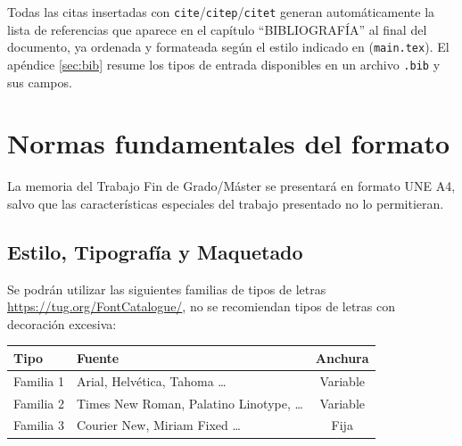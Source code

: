 Todas las citas insertadas con \texttt{cite}/\texttt{citep}/\texttt{citet} generan automáticamente la lista de referencias que aparece en el capítulo ``BIBLIOGRAFÍA'' al final del documento, ya ordenada y formateada según el estilo indicado en \lstinline[language=enparrafo]!! (\texttt{main.tex}). El apéndice \ref{sec:bib} resume los tipos de entrada disponibles en un archivo \texttt{.bib} y sus campos.



\chapter{Normas fundamentales del formato}
\label{sec:funda}

La memoria del Trabajo Fin de Grado/Máster se presentará en formato  UNE  A4,  salvo  que  las  características  especiales  del  trabajo  presentado  no  lo permitieran.

\section {Estilo,  Tipografía y    Maquetado}

Se podrán utilizar las siguientes familias de tipos de letras \url{https://tug.org/FontCatalogue/}, no se recomiendan tipos de letras con decoración excesiva:

	\begin{center}
	\begin{tabular}{p{2cm}p{7.5cm}c}
		\textbf{Tipo} & \textbf{Fuente} & \textbf{Anchura} \\ \hline
         Familia 1 & Arial, Helvética, Tahoma  	\ldots & Variable \\
         Familia 2 & Times New Roman, Palatino  Linotype,  	\ldots & Variable  \\
         Familia 3 & Courier  New,  Miriam Fixed \ldots & Fija\\
         \hline
	\end{tabular}
	\end{center}



